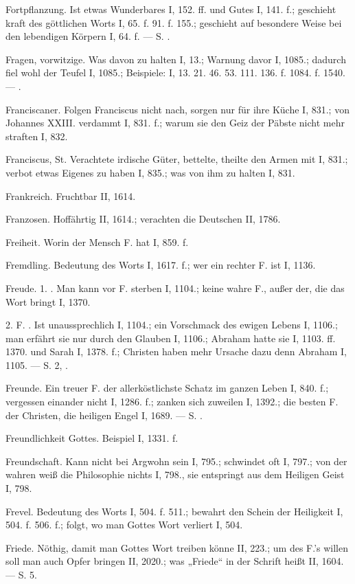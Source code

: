 Fortpflanzung. Ist etwas Wunderbares I, 152. ff. und Gutes I, 141. f.; geschieht kraft des göttlichen Worts I, 65. f. 91. f. 155.; geschieht auf besondere Weise bei den lebendigen Körpern I, 64. f. — S. .

Fragen, vorwitzige. Was davon zu halten I, 13.; Warnung davor I, 1085.; dadurch fiel wohl der Teufel I, 1085.; Beispiele: I, 13. 21. 46. 53. 111. 136. f. 1084. f. 1540. — .

Franciscaner. Folgen Franciscus nicht nach, sorgen nur für ihre Küche I, 831.; von Johannes XXIII. verdammt I, 831. f.; warum sie den Geiz der Päbste nicht mehr straften I, 832.

Franciscus, St. Verachtete irdische Güter, bettelte, theilte den Armen mit I, 831.; verbot etwas Eigenes zu haben I, 835.; was von ihm zu halten I, 831.

Frankreich. Fruchtbar II, 1614.

Franzosen. Hoffährtig II, 1614.; verachten die Deutschen II, 1786.

Freiheit. Worin der Mensch F. hat I, 859. f.

Fremdling. Bedeutung des Worts I, 1617. f.; wer ein rechter F. ist I, 1136.

Freude. 1. . Man kann vor F. sterben I, 1104.; keine wahre F., außer der, die das Wort bringt I, 1370.

2. F. . Ist unaussprechlich I, 1104.; ein Vorschmack des ewigen Lebens I, 1106.; man erfährt sie nur durch den Glauben I, 1106.; Abraham hatte sie I, 1103. ff. 1370. und Sarah I, 1378. f.; Christen haben mehr Ursache dazu denn Abraham I, 1105. — S.  2, .

Freunde. Ein treuer F. der allerköstlichste Schatz im ganzen Leben I, 840. f.; vergessen einander nicht I, 1286. f.; zanken sich zuweilen I, 1392.; die besten F. der Christen, die heiligen Engel I, 1689. — S. .

Freundlichkeit Gottes. Beispiel I, 1331. f.

Freundschaft. Kann nicht bei Argwohn sein I, 795.; schwindet oft I, 797.; von der wahren weiß die Philosophie nichts I, 798., sie entspringt aus dem Heiligen Geist I, 798.

Frevel. Bedeutung des Worts I, 504. f. 511.; bewahrt den Schein der Heiligkeit I, 504. f. 506. f.; folgt, wo man Gottes Wort verliert I, 504.

Friede. Nöthig, damit man Gottes Wort treiben könne II, 223.; um des F.’s willen soll man auch Opfer bringen II, 2020.; was „Friede“ in der Schrift heißt II, 1604. — S.  5.

